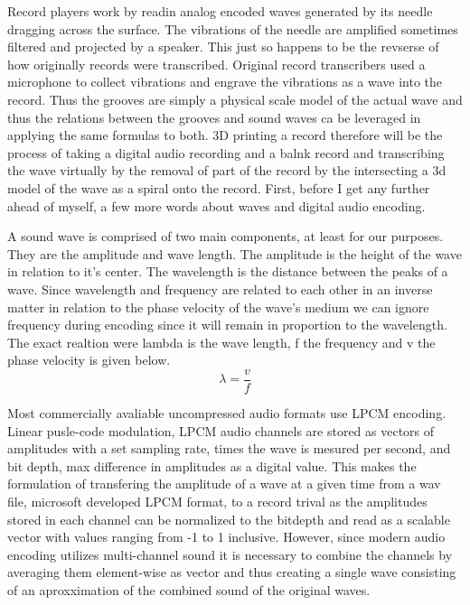 \documentclass[12pt]{report}
\author{Edward Conn}
\begin{document}
\begin{normalsize} Record players work by readin analog encoded waves generated by its needle dragging across the surface.  The vibrations of the needle are amplified sometimes filtered and projected by a speaker.  This just so happens to be the revserse of how originally records were transcribed.  Original record transcribers used a microphone to collect vibrations and engrave the vibrations as a wave into the record. Thus the grooves are simply a physical scale model of the actual wave and thus the relations between the grooves and sound waves ca be leveraged in applying the same formulas to both.  3D printing a record therefore will be the process of taking a digital audio recording and a balnk record and transcribing the wave virtually by the removal of part of the record by the intersecting a 3d model of the wave as a spiral onto the record.  First, before I get any further ahead of myself, a few more words about waves and digital audio encoding.


A sound wave is comprised of two main components, at least for our purposes.  They are the amplitude and wave length.  The amplitude is the height of the wave in relation to it's center.  The wavelength is the distance between the peaks of a wave. Since wavelength and frequency are related to each other in an inverse matter in relation to the phase velocity of the wave's medium we can ignore frequency during encoding since it will remain in proportion to the wavelength. The exact realtion were lambda is the wave length, f the frequency and v the phase velocity is given below.
\begin{equation}
\lambda = \frac{v}{f}
\end{equation}


Most commercially avaliable uncompressed audio formats use LPCM encoding. Linear  pusle-code modulation, LPCM audio channels are stored as vectors of amplitudes with a set sampling rate, times the wave is mesured per second, and bit depth, max difference in amplitudes as a digital value.  This makes the formulation of transfering the amplitude of a wave at a given time from a wav file, microsoft developed LPCM format, to a record trival as the amplitudes stored in each channel can be normalized to the bitdepth and read as a scalable vector with values ranging from -1 to 1 inclusive.  However, since modern audio encoding utilizes multi-channel sound it is necessary to combine the channels by averaging them element-wise as vector and thus creating a single wave consisting of an aproxximation of the combined sound of the original waves.


\end{normalsize}
\end{document}
